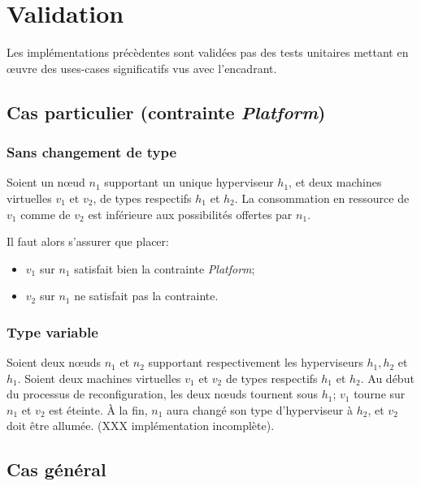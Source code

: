 \documentclass[a4paper]{article}
\begin{document}
\section{Validation}
Les implémentations précèdentes sont validées pas des tests unitaires mettant
en œuvre des uses-cases significatifs vus avec l'encadrant.
\subsection{Cas particulier (contrainte \textit{Platform})}
\subsubsection{Sans changement de type}
Soient un nœud $n_1$ supportant un unique hyperviseur $h_1$, et deux
machines virtuelles $v_1$ et $v_2$, de types respectifs $h_1$ et $h_2$.
La consommation en ressource de $v_1$ comme de $v_2$ est inférieure aux
possibilités offertes par $n_1$.

Il faut alors s'assurer que placer:
\begin{itemize}
	\item $v_1$ sur $n_1$ satisfait bien la contrainte \textit{Platform};
	\item $v_2$ sur $n_1$ ne satisfait pas la contrainte.
\end{itemize}
\subsubsection{Type variable}
Soient deux nœuds $n_1$ et $n_2$ supportant respectivement les hyperviseurs
$h_1, h_2$ et $h_1$. Soient deux machines virtuelles $v_1$ et $v_2$ de
types respectifs $h_1$ et $h_2$. Au début du processus de reconfiguration,
les deux nœuds tournent sous $h_1$; $v_1$ tourne sur $n_1$ et $v_2$ est
éteinte. À la fin, $n_1$ aura changé son type d'hyperviseur à $h_2$, et
$v_2$ doit être allumée. (XXX implémentation incomplète).

\subsection{Cas général}
\newpage
{}


\end{document}
